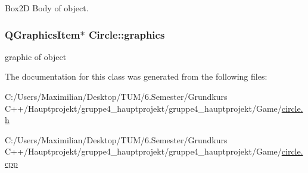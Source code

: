Box2D Body of object. 

\subsubsection[{\texorpdfstring{graphics}{graphics}}]{\setlength{\rightskip}{0pt plus 5cm}Q\+Graphics\+Item$\ast$ Circle\+::graphics}\hypertarget{class_circle_adcb606946696832caca242eafcc8322a}{}\label{class_circle_adcb606946696832caca242eafcc8322a}


graphic of object 



The documentation for this class was generated from the following files\+:\begin{DoxyCompactItemize}
\item 
C\+:/\+Users/\+Maximilian/\+Desktop/\+T\+U\+M/6.\+Semester/\+Grundkurs C++/\+Hauptprojekt/gruppe4\+\_\+hauptprojekt/gruppe4\+\_\+hauptprojekt/\+Game/\hyperlink{circle_8h}{circle.\+h}\item 
C\+:/\+Users/\+Maximilian/\+Desktop/\+T\+U\+M/6.\+Semester/\+Grundkurs C++/\+Hauptprojekt/gruppe4\+\_\+hauptprojekt/gruppe4\+\_\+hauptprojekt/\+Game/\hyperlink{circle_8cpp}{circle.\+cpp}\end{DoxyCompactItemize}
